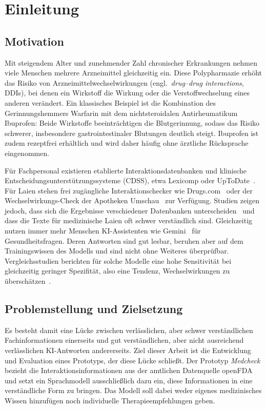 \chapter{Einleitung}
\label{ch:einleitung}

\section{Motivation}

Mit steigendem Alter und zunehmender Zahl chronischer Erkrankungen nehmen viele Menschen mehrere Arzneimittel gleichzeitig ein. Diese Polypharmazie erhöht das Risiko von Arzneimittelwechselwirkungen (engl.\ \emph{drug--drug interactions}, DDIs), bei denen ein Wirkstoff die Wirkung oder die Verstoffwechselung eines anderen verändert. Ein klassisches Beispiel ist die Kombination des Gerinnungshemmers Warfarin mit dem nichtsteroidalen Antirheumatikum Ibuprofen: Beide Wirkstoffe beeinträchtigen die Blutgerinnung, sodass das Risiko schwerer, insbesondere gastrointestinaler Blutungen deutlich steigt. Ibuprofen ist zudem rezeptfrei erhältlich und wird daher häufig ohne ärztliche Rücksprache eingenommen.

Für Fachpersonal existieren etablierte Interaktionsdatenbanken und klinische Entscheidungsunterstützungssysteme (CDSS), etwa Lexicomp oder UpToDate~\cite{UpToDate}. Für Laien stehen frei zugängliche Interaktionschecker wie Drugs.com~\cite{DrugsCom2025} oder der Wechselwirkungs-Check der Apotheken Umschau~\cite{ApothekenUmschau} zur Verfügung. Studien zeigen jedoch, dass sich die Ergebnisse verschiedener Datenbanken unterscheiden~\cite{article, Roca2022} und dass die Texte für medizinische Laien oft schwer verständlich sind. Gleichzeitig nutzen immer mehr Menschen KI-Assistenten wie Gemini~\cite{GoogleGemini} für Gesundheitsfragen. Deren Antworten sind gut lesbar, beruhen aber auf dem Trainingswissen des Modells und sind nicht ohne Weiteres überprüfbar. Vergleichsstudien berichten für solche Modelle eine hohe Sensitivität bei gleichzeitig geringer Spezifität, also eine Tendenz, Wechselwirkungen zu überschätzen~\cite{MOHAMMED2026100733}.

\section{Problemstellung und Zielsetzung}

Es besteht damit eine Lücke zwischen verlässlichen, aber schwer verständlichen Fachinformationen einerseits und gut verständlichen, aber nicht ausreichend verlässlichen KI-Antworten andererseits. Ziel dieser Arbeit ist die Entwicklung und Evaluation eines Prototyps, der diese Lücke schließt. Der Prototyp \emph{Medcheck} bezieht die Interaktionsinformationen aus der amtlichen Datenquelle openFDA~\cite{openFDA} und setzt ein Sprachmodell ausschließlich dazu ein, diese Informationen in eine verständliche Form zu bringen. Das Modell soll dabei weder eigenes medizinisches Wissen hinzufügen noch individuelle Therapieempfehlungen geben.

